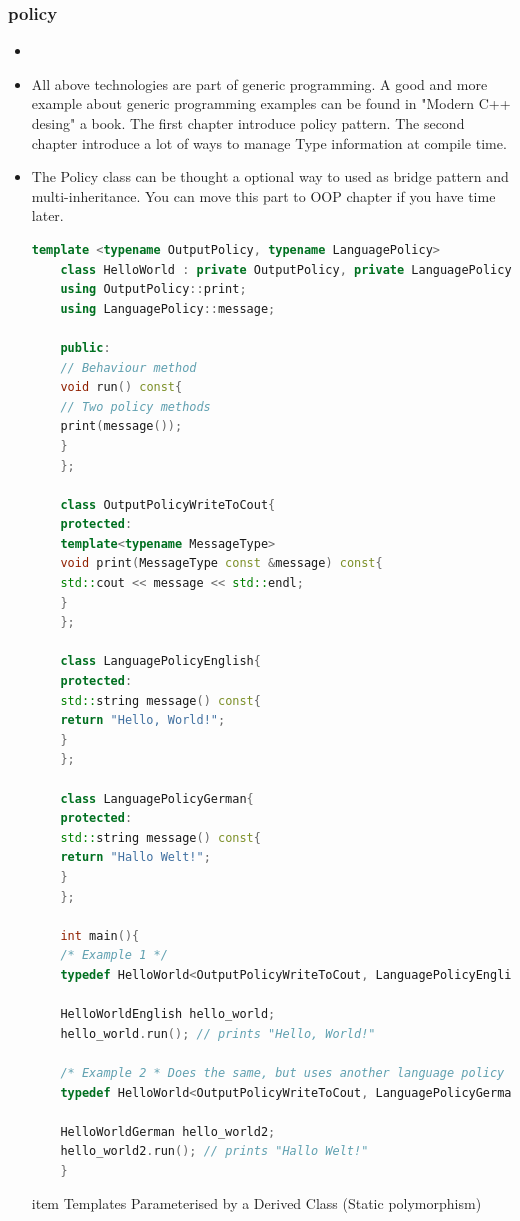\documentclass[a4paper,12pt,twoside]{book}
\begin{document}
\subsubsection{policy}
\begin{itemize}
	\item \item All above technologies are part of generic programming. A good and more example about generic programming examples can be found in "Modern C++ desing" a book. The first chapter introduce policy pattern. The second chapter introduce a lot of ways to manage Type information at compile time. 
	
	\item The Policy class can be thought a optional way to used as bridge pattern and multi-inheritance. You can move this part to OOP chapter if you have time later.
	
	\begin{lstlisting}[frame=single, language=c++]
	template <typename OutputPolicy, typename LanguagePolicy>
	class HelloWorld : private OutputPolicy, private LanguagePolicy{
	using OutputPolicy::print;
	using LanguagePolicy::message;
	
	public:
	// Behaviour method
	void run() const{
	// Two policy methods
	print(message());
	}
	};
	
	class OutputPolicyWriteToCout{
	protected:
	template<typename MessageType>
	void print(MessageType const &message) const{
	std::cout << message << std::endl;
	}
	};
	
	class LanguagePolicyEnglish{
	protected:
	std::string message() const{
	return "Hello, World!";
	}
	};
	
	class LanguagePolicyGerman{
	protected:
	std::string message() const{
	return "Hallo Welt!";
	}
	};
	
	int main(){
	/* Example 1 */
	typedef HelloWorld<OutputPolicyWriteToCout, LanguagePolicyEnglish> HelloWorldEnglish;
	
	HelloWorldEnglish hello_world;
	hello_world.run(); // prints "Hello, World!"
	
	/* Example 2 * Does the same, but uses another language policy */
	typedef HelloWorld<OutputPolicyWriteToCout, LanguagePolicyGerman> HelloWorldGerman;
	
	HelloWorldGerman hello_world2;
	hello_world2.run(); // prints "Hallo Welt!"
	}
	\end{lstlisting}
	
	item Templates Parameterised by a Derived Class (Static polymorphism)
	

\end{itemize}
\end{document}

